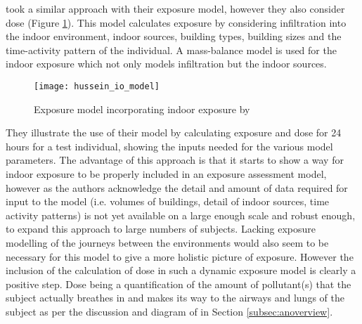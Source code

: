 \cite{Hussein2014} took a similar approach with their exposure model, however they also consider dose (Figure \ref{fig:husseiniomodel}). This model calculates exposure by considering infiltration into the indoor environment, indoor sources, building types, building sizes and the time-activity pattern of the individual. A mass-balance model is used for the indoor exposure which not only models infiltration but the indoor sources.

\begin{figure}[H]
\centering
\texttt{[image: hussein\_io\_model]}
\caption{Exposure model incorporating indoor exposure by \cite{Hussein2014}}
\label{fig:husseiniomodel}
\end{figure}

They illustrate the use of their model by calculating exposure and dose for 24 hours for a test individual, showing the inputs needed for the various model parameters. The advantage of this approach is that it starts to show a way for indoor exposure to be properly included in an exposure assessment model, however as the authors acknowledge the detail and amount of data required for input to the model (i.e. volumes of buildings, detail of indoor sources, time activity patterns) is not yet available on a large enough scale and robust enough, to expand this approach to large numbers of subjects. Lacking exposure modelling of the journeys between the environments would also seem to be necessary for this model to give a more holistic picture of exposure. However the inclusion of the calculation of dose in such a dynamic exposure model is clearly a positive step. Dose being a quantification of the amount of pollutant(s) that the subject actually breathes in and makes its way to the airways and lungs of the subject as per the discussion and diagram of \cite{Brook2010} in Section \ref{subsec:anoverview}.

